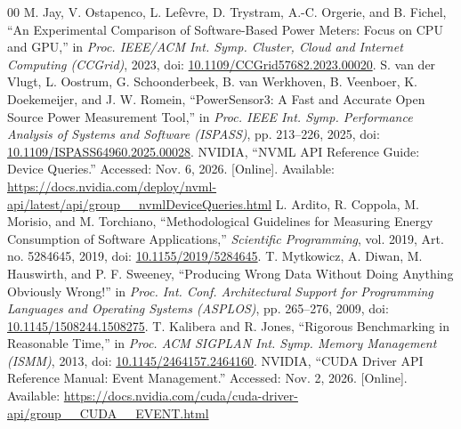 \documentclass[10pt,conference]{IEEEtran}
\begin{document}
\begin{thebibliography}{00}
 M. Jay, V. Ostapenco, L. Lef\`evre, D. Trystram, A.-C. Orgerie, and B. Fichel, ``An Experimental Comparison of Software-Based Power Meters: Focus on CPU and GPU,'' in \emph{Proc. IEEE/ACM Int. Symp. Cluster, Cloud and Internet Computing (CCGrid)}, 2023, doi: \href{https://doi.org/10.1109/CCGrid57682.2023.00020}{10.1109/CCGrid57682.2023.00020}.
 S. van der Vlugt, L. Oostrum, G. Schoonderbeek, B. van Werkhoven, B. Veenboer, K. Doekemeijer, and J. W. Romein, ``PowerSensor3: A Fast and Accurate Open Source Power Measurement Tool,'' in \emph{Proc. IEEE Int. Symp. Performance Analysis of Systems and Software (ISPASS)}, pp. 213--226, 2025, doi: \href{https://doi.org/10.1109/ISPASS64960.2025.00028}{10.1109/ISPASS64960.2025.00028}.
 NVIDIA, ``NVML API Reference Guide: Device Queries.'' Accessed: Nov. 6, 2026. [Online]. Available: \url{https://docs.nvidia.com/deploy/nvml-api/latest/api/group__nvmlDeviceQueries.html}
 L. Ardito, R. Coppola, M. Morisio, and M. Torchiano, ``Methodological Guidelines for Measuring Energy Consumption of Software Applications,'' \emph{Scientific Programming}, vol. 2019, Art. no. 5284645, 2019, doi: \href{https://doi.org/10.1155/2019/5284645}{10.1155/2019/5284645}.
 T. Mytkowicz, A. Diwan, M. Hauswirth, and P. F. Sweeney, ``Producing Wrong Data Without Doing Anything Obviously Wrong!'' in \emph{Proc. Int. Conf. Architectural Support for Programming Languages and Operating Systems (ASPLOS)}, pp. 265--276, 2009, doi: \href{https://doi.org/10.1145/1508244.1508275}{10.1145/1508244.1508275}.
 T. Kalibera and R. Jones, ``Rigorous Benchmarking in Reasonable Time,'' in \emph{Proc. ACM SIGPLAN Int. Symp. Memory Management (ISMM)}, 2013, doi: \href{https://doi.org/10.1145/2464157.2464160}{10.1145/2464157.2464160}.
 NVIDIA, ``CUDA Driver API Reference Manual: Event Management.'' Accessed: Nov. 2, 2026. [Online]. Available: \url{https://docs.nvidia.com/cuda/cuda-driver-api/group__CUDA__EVENT.html}
\end{thebibliography}
\end{document}
